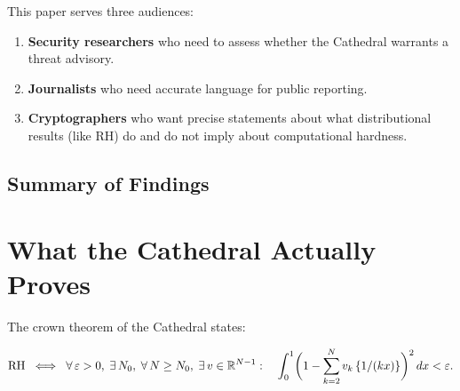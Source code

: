 \documentclass[11pt,a4paper]{article}
\begin{document}
This paper serves three audiences:

\begin{enumerate}
  \item \textbf{Security researchers} who need to assess whether the
    Cathedral warrants a threat advisory.
  \item \textbf{Journalists} who need accurate language for public
    reporting.
  \item \textbf{Cryptographers} who want precise statements about
    what distributional results (like RH) do and do not imply about
    computational hardness.
\end{enumerate}

\subsection{Summary of Findings}

\begin{center}
\end{center}

\section{What the Cathedral Actually Proves}
\label{sec:what}

The crown theorem of the Cathedral states:
\begin{theorem}
\[
  \mathrm{RH} \;\iff\;
  \forall\,\varepsilon > 0,\;\exists\,N_0,\;\forall\,N \geq N_0,\;
  \exists\,v \in \mathbb{R}^{N-1} :\quad
  \int_0^1 \biggl(1 - \sum_{k=2}^{N} v_k\,\{1/(kx)\}\biggr)^2\,dx < \varepsilon.
\]
\end{theorem}
\end{document}
